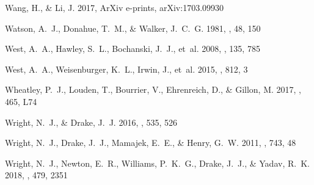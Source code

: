 \documentclass[twocolumn]{aastex62}
\begin{document}
\begin{thebibliography}{}
{Wang}, H., \& {Li}, J. 2017, ArXiv e-prints, arXiv:1703.09930

{Watson}, A.~J., {Donahue}, T.~M., \& {Walker}, J.~C.~G. 1981, \icarus, 48, 150

{West}, A.~A., {Hawley}, S.~L., {Bochanski}, J.~J., {et~al.} 2008, \aj, 135,
  785

{West}, A.~A., {Weisenburger}, K.~L., {Irwin}, J., {et~al.} 2015, \apj, 812, 3

{Wheatley}, P.~J., {Louden}, T., {Bourrier}, V., {Ehrenreich}, D., \& {Gillon},
  M. 2017, \mnras, 465, L74

{Wright}, N.~J., \& {Drake}, J.~J. 2016, \nat, 535, 526

{Wright}, N.~J., {Drake}, J.~J., {Mamajek}, E.~E., \& {Henry}, G.~W. 2011,
  \apj, 743, 48

{Wright}, N.~J., {Newton}, E.~R., {Williams}, P.~K.~G., {Drake}, J.~J., \&
  {Yadav}, R.~K. 2018, \mnras, 479, 2351

\end{thebibliography}

\end{document}
